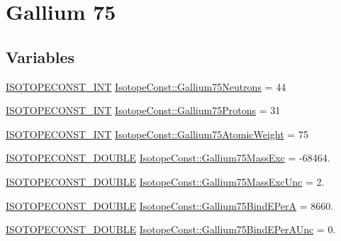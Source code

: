 \hypertarget{group___isotope_const-_gallium-_ga75}{}\section{Gallium 75}
\label{group___isotope_const-_gallium-_ga75}
\subsection*{Variables}
\begin{DoxyCompactItemize}
\item 
\mbox{\hyperlink{group___isotope_const-_macros_ga5f18360b3e99483a35c32d789e62621c}{I\+S\+O\+T\+O\+P\+E\+C\+O\+N\+S\+T\+\_\+\+I\+NT}} \mbox{\hyperlink{group___isotope_const-_gallium-_ga75_ga8baf93a2d97ac766af32320ee268b630}{Isotope\+Const\+::\+Gallium75\+Neutrons}} = 44
\item 
\mbox{\hyperlink{group___isotope_const-_macros_ga5f18360b3e99483a35c32d789e62621c}{I\+S\+O\+T\+O\+P\+E\+C\+O\+N\+S\+T\+\_\+\+I\+NT}} \mbox{\hyperlink{group___isotope_const-_gallium-_ga75_ga2640b378f591a4dcddeb89acda70ff1a}{Isotope\+Const\+::\+Gallium75\+Protons}} = 31
\item 
\mbox{\hyperlink{group___isotope_const-_macros_ga5f18360b3e99483a35c32d789e62621c}{I\+S\+O\+T\+O\+P\+E\+C\+O\+N\+S\+T\+\_\+\+I\+NT}} \mbox{\hyperlink{group___isotope_const-_gallium-_ga75_ga8fbbbfd7bffcab084ac2a5830ea9d9bb}{Isotope\+Const\+::\+Gallium75\+Atomic\+Weight}} = 75
\item 
\mbox{\hyperlink{group___isotope_const-_macros_ga8f45a7272ce02c0b4c65c44636ed719a}{I\+S\+O\+T\+O\+P\+E\+C\+O\+N\+S\+T\+\_\+\+D\+O\+U\+B\+LE}} \mbox{\hyperlink{group___isotope_const-_gallium-_ga75_ga5b2057aada90938b63e02c3b8c03e171}{Isotope\+Const\+::\+Gallium75\+Mass\+Exc}} = -\/68464.
\item 
\mbox{\hyperlink{group___isotope_const-_macros_ga8f45a7272ce02c0b4c65c44636ed719a}{I\+S\+O\+T\+O\+P\+E\+C\+O\+N\+S\+T\+\_\+\+D\+O\+U\+B\+LE}} \mbox{\hyperlink{group___isotope_const-_gallium-_ga75_gae6d36512d207c3962f084f263435050f}{Isotope\+Const\+::\+Gallium75\+Mass\+Exc\+Unc}} = 2.
\item 
\mbox{\hyperlink{group___isotope_const-_macros_ga8f45a7272ce02c0b4c65c44636ed719a}{I\+S\+O\+T\+O\+P\+E\+C\+O\+N\+S\+T\+\_\+\+D\+O\+U\+B\+LE}} \mbox{\hyperlink{group___isotope_const-_gallium-_ga75_ga68702ae4e4d1495a8bb77059797e389e}{Isotope\+Const\+::\+Gallium75\+Bind\+E\+PerA}} = 8660.
\item 
\mbox{\hyperlink{group___isotope_const-_macros_ga8f45a7272ce02c0b4c65c44636ed719a}{I\+S\+O\+T\+O\+P\+E\+C\+O\+N\+S\+T\+\_\+\+D\+O\+U\+B\+LE}} \mbox{\hyperlink{group___isotope_const-_gallium-_ga75_gaba9e2b9a8a7ae02be951f636c3b300d9}{Isotope\+Const\+::\+Gallium75\+Bind\+E\+Per\+A\+Unc}} = 0.

\end{DoxyCompactItemize}
